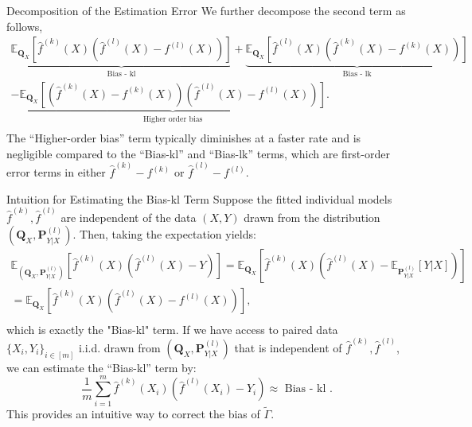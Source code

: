 \documentclass{beamer}
\begin{document}
\begin{frame}{Decomposition of the Estimation Error}
    We further decompose the second term as follows,
    $$
    \begin{array}{l} \underbrace {\mathbb {E} _ {\mathbf {Q} _ {X}} \left[ \widehat {f} ^ {(k)} (X) \left(\widehat {f} ^ {(l)} (X) - f ^ {(l)} (X)\right) \right]} _ {\text {Bias - kl}} + \underbrace {\mathbb {E} _ {\mathbf {Q} _ {X}} \left[ \widehat {f} ^ {(l)} (X) \left(\widehat {f} ^ {(k)} (X) - f ^ {(k)} (X)\right) \right]} _ {\text {Bias - lk}} \\ - \underbrace {\mathbb {E} _ {\mathbf {Q} _ {X}} \left[ \left(\widehat {f} ^ {(k)} (X) - f ^ {(k)} (X)\right) \left(\widehat {f} ^ {(l)} (X) - f ^ {(l)} (X)\right) \right]} _ {\text {Higher order bias}}. \\ \end{array}
    $$
    The “Higher-order bias” term typically diminishes at a faster rate and is negligible compared to the “Bias-kl” and “Bias-lk” terms, which are first-order error terms in either $\widehat { f } ^ { ( k ) } - f ^ { ( k ) }$ or $\widehat { f } ^ { ( l ) } - f ^ { ( l ) }$.
\end{frame}

\begin{frame}{Intuition for Estimating the Bias-kl Term}
    Suppose the fitted individual models $\widehat { f } ^ { ( k ) } , \widehat { f } ^ { ( l ) }$ are independent of the data $( X , Y )$ drawn from the distribution $(\mathbf { Q } _ { X } , \mathbf { P } _ { Y | X } ^ { ( l ) } )$. Then, taking the expectation yields:
    $$
    \begin{array}{l} \mathbb {E} _ {(\mathbf {Q} _ {X}, \mathbf {P} _ {Y | X} ^ {(l)})} \left[ \widehat {f} ^ {(k)} (X) \left(\widehat {f} ^ {(l)} (X) - Y\right) \right] = \mathbb {E} _ {\mathbf {Q} _ {X}} \left[ \widehat {f} ^ {(k)} (X) \left(\widehat {f} ^ {(l)} (X) - \mathbb {E} _ {\mathbf {P} _ {Y | X} ^ {(l)}} [ Y | X ]\right) \right] \\ = \mathbb {E} _ {\mathbf {Q} _ {X}} \left[ \widehat {f} ^ {(k)} (X) \left(\widehat {f} ^ {(l)} (X) - f ^ {(l)} (X)\right) \right], \\ \end{array}
    $$
    which is exactly the "Bias-kl" term. If we have access to paired data $\{ X _ { i } , Y _ { i } \} _ { i \in [ m ] }$ i.i.d. drawn from $(\mathbf { Q } _ { X } , \mathbf { P } _ { Y | X } ^ { ( l ) } )$ that is independent of $\widehat { f } ^ { ( k ) } , \widehat { f } ^ { ( l ) }$, we can estimate the “Bias-kl” term by:
    $$
    \frac {1}{m} \sum_ {i = 1} ^ {m} \widehat {f} ^ {(k)} (X _ {i}) \left(\widehat {f} ^ {(l)} (X _ {i}) - Y _ {i}\right) \approx \text { Bias - kl }. 
    $$
    This provides an intuitive way to correct the bias of $\widetilde \Gamma$.
\end{frame}
\end{document}
